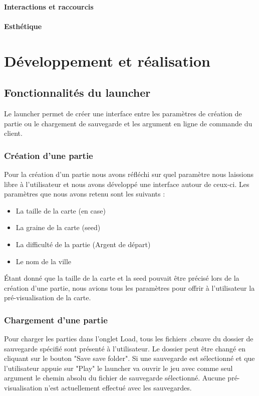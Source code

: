 \documentclass[a4paper,10pt,openany,oneside]{report}
\begin{document}
\subsubsection{Interactions et raccourcis}

\subsubsection{Esthétique}


\chapter{Développement et réalisation}
\thispagestyle{headings}
\section{Fonctionnalités du launcher}
Le launcher permet de créer une interface entre les paramètres de création de partie ou le chargement de sauvegarde et les argument en ligne de commande du client.
\subsection{Création d'une partie}
Pour la création d'un partie nous avons réfléchi sur quel paramètre nous laissions libre à l'utilisateur et nous avons développé une interface autour de ceux-ci.
\newline
Les paramètres que nous avons retenu sont les suivants :
\begin{itemize}
	\item La taille de la carte (en case)
	\item La graine de la carte (seed)
	\item La difficulté de la partie (Argent de départ)
	\item Le nom de la ville
\end{itemize}
Étant donné que la taille de la carte et la seed pouvait être précisé lors de la création d'une partie, nous avions tous les paramètres pour offrir à l'utilisateur la pré-visualisation de la carte.
\subsection{Chargement d'une partie}
Pour charger les parties dans l'onglet Load, tous les fichiers .cbsave du dossier de sauvegarde spécifié sont présenté à l'utilisateur. Le dossier peut être changé en cliquant sur le bouton "Save save folder".
Si une sauvegarde est sélectionné et que l'utilisateur appuie sur "Play" le launcher va ouvrir le jeu avec comme seul argument le chemin absolu du fichier de sauvegarde sélectionné. Aucune pré-visualisation n'est actuellement effectué avec les sauvegardes.
\end{document}

